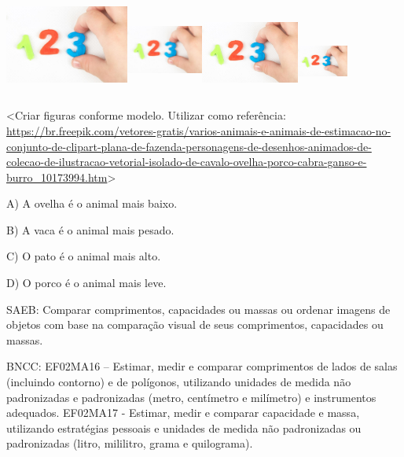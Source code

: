 \includegraphics[width=1.60383in,height=1.29919in]{media/image114.png}\includegraphics[width=0.99316in,height=1.17006in]{media/image114.png}\includegraphics[width=1.27263in,height=1.09078in]{media/image114.png}\includegraphics[width=0.65433in,height=0.85550in]{media/image114.png}

\textless{}Criar figuras conforme modelo. Utilizar como referência:
\url{https://br.freepik.com/vetores-gratis/varios-animais-e-animais-de-estimacao-no-conjunto-de-clipart-plana-de-fazenda-personagens-de-desenhos-animados-de-colecao-de-ilustracao-vetorial-isolado-de-cavalo-ovelha-porco-cabra-ganso-e-burro_10173994.htm}\textgreater{}

A) A ovelha é o animal mais baixo.

B) A vaca é o animal mais pesado.

C) O pato é o animal mais alto.

D) O porco é o animal mais leve.

SAEB: Comparar comprimentos, capacidades ou massas ou ordenar
imagens de objetos com base na comparação visual de seus comprimentos,
capacidades ou massas.

BNCC: EF02MA16 -- Estimar, medir e comparar comprimentos de lados de
salas (incluindo contorno) e de polígonos, utilizando unidades de medida
não padronizadas e padronizadas (metro, centímetro e milímetro) e
instrumentos adequados. EF02MA17 - Estimar, medir e comparar capacidade
e massa, utilizando estratégias pessoais e unidades de medida não
padronizadas ou padronizadas (litro, mililitro, grama e quilograma).


